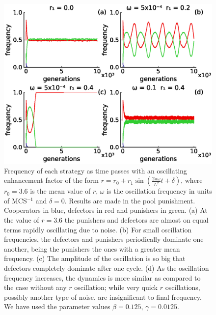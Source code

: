 \begin{figure}
	\centering
	\includegraphics[width=1\linewidth]{Images/P2/freq_tiempo_T0seleccion_Pool.eps}
	\caption{Frequency of each strategy as time passes with an oscillating enhancement factor of the form $r=r_0+r_1\sin(\frac{2\pi \omega}{L^2}t+\delta)$, where  $r_0=3.6$ is the mean value of $r$, $\omega$ is the oscillation frequency in units of MCS$^{-1}$ and $\delta=0$. Results are made in the pool punishment. Cooperators in blue, defectors in red and punishers in green. (a) At the value of $r=3.6$ the punishers and defectors are almost on equal terms rapidly oscillating due to noise. (b) For small oscillation frequencies, the defectors and punishers periodically dominate one another, being the punishers the ones with a greater mean frequency. (c) The amplitude of the oscillation is so big that defectors completely dominate after one cycle. (d) As the oscillation frequency increases, the dynamics is more similar as compared to the case without any $r$ oscillation; while very quick $r$ oscillations, possibly another type of noise, are insignificant to final frequency. We have used the parameter values $\beta=0.125$, $\gamma=0.0125$.}
	\label{oscila}
\end{figure}



